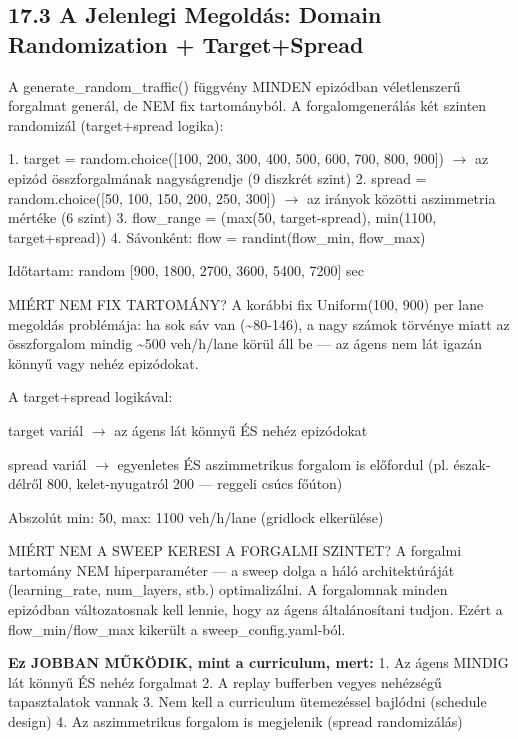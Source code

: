 \documentclass[11pt,a4paper]{article}
\begin{document}
\subsection*{17.3 A Jelenlegi Megoldás: Domain Randomization + Target+Spread}
A generate\_random\_traffic() függvény MINDEN epizódban véletlenszerű
forgalmat generál, de NEM fix tartományból. A forgalomgenerálás
két szinten randomizál (target+spread logika):

1. target = random.choice([100, 200, 300, 400, 500, 600, 700, 800, 900])
$\rightarrow$ az epizód összforgalmának nagyságrendje (9 diszkrét szint)
2. spread = random.choice([50, 100, 150, 200, 250, 300])
$\rightarrow$ az irányok közötti aszimmetria mértéke (6 szint)
3. flow\_range = (max(50, target-spread), min(1100, target+spread))
4. Sávonként: flow = randint(flow\_min, flow\_max)
\par\noindent\hspace*{1em}\textbullet{} Időtartam: random [900, 1800, 2700, 3600, 5400, 7200] sec

MIÉRT NEM FIX TARTOMÁNY?
A korábbi fix Uniform(100, 900) per lane megoldás problémája:
ha sok sáv van (\textasciitilde{}80-146), a nagy számok törvénye miatt az összforgalom
mindig \textasciitilde{}500 veh/h/lane körül áll be — az ágens nem lát igazán
könnyű vagy nehéz epizódokat.

A target+spread logikával:
\par\noindent\hspace*{1em}\textbullet{} target variál $\rightarrow$ az ágens lát könnyű ÉS nehéz epizódokat
\par\noindent\hspace*{1em}\textbullet{} spread variál $\rightarrow$ egyenletes ÉS aszimmetrikus forgalom is előfordul
(pl. észak-délről 800, kelet-nyugatról 200 — reggeli csúcs főúton)
\par\noindent\hspace*{1em}\textbullet{} Abszolút min: 50, max: 1100 veh/h/lane (gridlock elkerülése)

MIÉRT NEM A SWEEP KERESI A FORGALMI SZINTET?
A forgalmi tartomány NEM hiperparaméter — a sweep dolga a háló
architektúráját (learning\_rate, num\_layers, stb.) optimalizálni.
A forgalomnak minden epizódban változatosnak kell lennie, hogy az
ágens általánosítani tudjon. Ezért a flow\_min/flow\_max kikerült
a sweep\_config.yaml-ból.

\textbf{Ez JOBBAN MŰKÖDIK, mint a curriculum, mert:}
1. Az ágens MINDIG lát könnyű ÉS nehéz forgalmat
2. A replay bufferben vegyes nehézségű tapasztalatok vannak
3. Nem kell a curriculum ütemezéssel bajlódni (schedule design)
4. Az aszimmetrikus forgalom is megjelenik (spread randomizálás)
\end{document}
